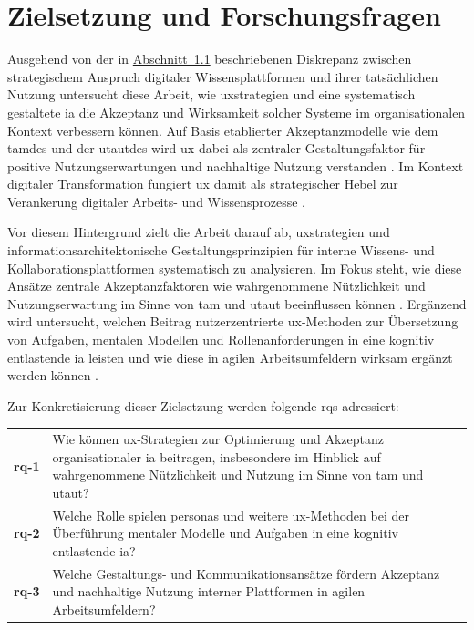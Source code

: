\section{Zielsetzung und Forschungsfragen}
\label{sec:01-03_research-goals}

Ausgehend von der in \hyperref[sec:01-01_problem-and-context]{Abschnitt~1.1} beschriebenen Diskrepanz zwischen strategischem Anspruch digitaler Wissensplattformen und ihrer tatsächlichen Nutzung untersucht diese Arbeit, wie \Gls{uxstrategien} und eine systematisch gestaltete \Gls{ia} die Akzeptanz und Wirksamkeit solcher Systeme im organisationalen Kontext verbessern können. Auf Basis etablierter Akzeptanzmodelle wie dem \Gls{tamdes} und der \Gls{utautdes} wird \Gls{ux} dabei als zentraler Gestaltungsfaktor für positive Nutzungserwartungen und nachhaltige Nutzung verstanden \cite{102:Davis1989,103:Venkatesh2003}. Im Kontext digitaler Transformation fungiert \Gls{ux} damit als strategischer Hebel zur Verankerung digitaler Arbeits- und Wissensprozesse \cite{403:Westerman2014,100:WhartonUX2015}.

Vor diesem Hintergrund zielt die Arbeit darauf ab, \Gls{uxstrategien} und informationsarchitektonische Gestaltungsprinzipien für interne Wissens- und Kollaborationsplattformen systematisch zu analysieren. Im Fokus steht, wie diese Ansätze zentrale Akzeptanzfaktoren wie wahrgenommene Nützlichkeit und Nutzungserwartung im Sinne von \acrshort{tam} und \acrshort{utaut} beeinflussen können \cite{102:Davis1989,103:Venkatesh2003}. Ergänzend wird untersucht, welchen Beitrag nutzerzentrierte \Gls{ux}-Methoden zur Übersetzung von Aufgaben, mentalen Modellen und Rollenanforderungen in eine kognitiv entlastende \Gls{ia} leisten und wie diese in agilen Arbeitsumfeldern wirksam ergänzt werden können \cite{300:FraunhoferIESE2018,401:Garrett2011,303:Rosenfeld2015}.

Zur Konkretisierung dieser Zielsetzung werden folgende \Glspl{rq} adressiert:

\begin{table}[H]
    \centering
    \begin{tabular}{p{} p{}}
        \textbf{\Gls{rq}-1} & Wie können \Gls{ux}-Strategien zur Optimierung und Akzeptanz organisationaler \acrlong{ia} beitragen, insbesondere im Hinblick auf wahrgenommene Nützlichkeit und Nutzung im Sinne von \acrshort{tam} und \acrshort{utaut}? \\[1em]

        \textbf{\Gls{rq}-2} & Welche Rolle spielen \Gls{personas} und weitere \Gls{ux}-Methoden bei der Überführung mentaler Modelle und Aufgaben in eine kognitiv entlastende \acrlong{ia}?                                              \\[1em]

        \textbf{\Gls{rq}-3} & Welche Gestaltungs- und Kommunikationsansätze fördern Akzeptanz und nachhaltige Nutzung interner Plattformen in agilen Arbeitsumfeldern?                                                          \\
    \end{tabular}
\end{table}

